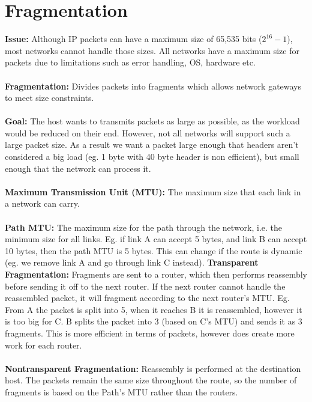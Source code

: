 \documentclass[a4paper,10pt]{article}
\begin{document}
\section{Fragmentation}
\textcolor{Peach}{\textbf{Issue:}} Although IP packets can have a maximum size of 65,535 bits ($2^{16} - 1$), most networks cannot handle those sizes. All networks have a maximum size for packets due to limitations such as error handling, OS, hardware etc. \\\\
\textcolor{Peach}{\textbf{Fragmentation:}} Divides packets into fragments which allows network gateways to meet size constraints. \\\\
\textcolor{Peach}{\textbf{Goal:}} The host wants to transmits packets as large as possible, as the workload would be reduced on their end. However, not all networks will support such a large packet size. As a result we want a packet large enough that headers aren't considered a big load (eg. 1 byte with 40 byte header is non efficient), but small enough that the network can process it. \\\\
\textcolor{Peach}{\textbf{Maximum Transmission Unit (MTU):}} The maximum size that each link in a network can carry. \\\\
\textcolor{Peach}{\textbf{Path MTU:}} The maximum size for the path through the network, i.e. the minimum size for all links. Eg. if link A can accept 5 bytes, and link B can accept 10 bytes, then the path MTU is 5 bytes. This can change if the route is dynamic (eg. we remove link A and go through link C instead). 
\newpage
\noindent \textcolor{Peach}{\textbf{Transparent Fragmentation:}} Fragments are sent to a router, which then performs reassembly before sending it off to the next router. If the next router cannot handle the reassembled packet, it will fragment according to the next router's MTU. Eg. From A the packet is split into 5, when it reaches B it is reassembled, however it is too big for C. B splits the packet into 3 (based on C's MTU) and sends it as 3 fragments. This is more efficient in terms of packets, however does create more work for each router.\\\\
\textcolor{Peach}{\textbf{Nontransparent Fragmentation:}} Reassembly is performed at the destination host. The packets remain the same size throughout the route, so the number of fragments is based on the Path's MTU rather than the routers. \\\\
\end{document}
